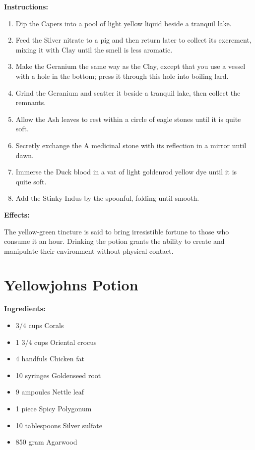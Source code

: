 \documentclass{article}
\begin{document}
\textbf{Instructions:}

\begin{enumerate}
  \item Dip the Capers into a pool of light yellow liquid beside a tranquil lake.
  \item Feed the Silver nitrate to a pig and then return later to collect its excrement, mixing it with Clay until the smell is less aromatic.
  \item Make the Geranium the same way as the Clay, except that you use a vessel with a hole in the bottom; press it through this hole into boiling lard.
  \item Grind the Geranium and scatter it beside a tranquil lake, then collect the remnants.
  \item Allow the Ash leaves to rest within a circle of eagle stones until it is quite soft.
  \item Secretly exchange the A medicinal stone with its reflection in a mirror until dawn.
  \item Immerse the Duck blood in a vat of light goldenrod yellow dye until it is quite soft.
  \item Add the Stinky Indus by the spoonful, folding until smooth.
\end{enumerate}

\textbf{Effects:}

The yellow-green tincture is said to bring irresistible fortune to those who consume it an hour. Drinking the potion grants the ability to create and manipulate their environment without physical contact.

\newpage
\section*{Yellowjohns Potion}

\textbf{Ingredients:}

\begin{itemize}
  \item 3/4 cups Corals
  \item 1 3/4 cups Oriental crocus
  \item 4 handfuls Chicken fat
  \item 10 syringes Goldenseed root
  \item 9 ampoules Nettle leaf
  \item 1 piece Spicy Polygonum
  \item 10 tablespoons Silver sulfate
  \item 850 gram Agarwood
\end{itemize}
\end{document}
